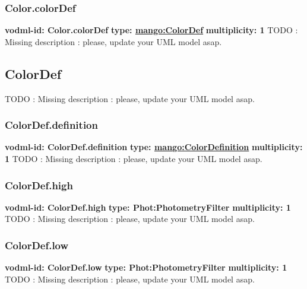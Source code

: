     \subsubsection{Color.colorDef}
      \textbf{vodml-id: Color.colorDef} \newline
      \textbf{type: \hyperref[sect:ColorDef]{mango:ColorDef}} \newline
      \textbf{multiplicity: 1} \newline
      TODO : Missing description : please, update your UML model asap.

  \subsection{ColorDef}
  \label{sect:ColorDef}
    TODO : Missing description : please, update your UML model asap.

    \subsubsection{ColorDef.definition}
      \textbf{vodml-id: ColorDef.definition} \newline
      \textbf{type: \hyperref[sect:ColorDefinition]{mango:ColorDefinition}} \newline
      \textbf{multiplicity: 1} \newline
      TODO : Missing description : please, update your UML model asap.

    \subsubsection{ColorDef.high}
      \textbf{vodml-id: ColorDef.high} \newline
      \textbf{type: Phot:PhotometryFilter} \newline
      \textbf{multiplicity: 1} \newline
      TODO : Missing description : please, update your UML model asap.

    \subsubsection{ColorDef.low}
      \textbf{vodml-id: ColorDef.low} \newline
      \textbf{type: Phot:PhotometryFilter} \newline
      \textbf{multiplicity: 1} \newline
      TODO : Missing description : please, update your UML model asap.

